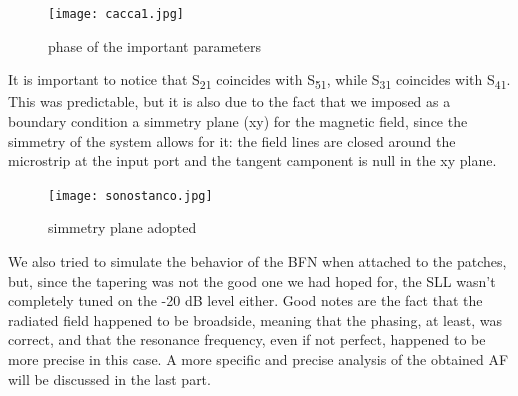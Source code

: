 \begin{figure}[H]
\centering
\texttt{[image: cacca1.jpg]}
\caption{phase of the important parameters}
\label{b}
\end{figure}


\par\medskip
\noindent
It is important to notice that S\textsubscript{21} coincides with S\textsubscript{51}, while S\textsubscript{31} coincides with S\textsubscript{41}. This was predictable, but it is also due to the fact that we imposed as a boundary condition a simmetry plane (xy) for the magnetic field, since the simmetry of the system allows for it: the field lines are closed around the microstrip at the input port and the tangent camponent is null in the xy plane.

\begin{figure}[H]
\centering
\texttt{[image: sonostanco.jpg]}
\caption{simmetry plane adopted}
\label{c}
\end{figure}

\par\medskip
\noindent
We also tried to simulate the behavior of the BFN when attached to the patches, but, since the tapering was not the good one we had hoped for, the SLL wasn't completely tuned on the -20 dB level either. Good notes are the fact that the radiated field happened to be broadside, meaning that the phasing, at least, was correct, and that the resonance frequency, even if not perfect, happened to be more precise in this case. A more specific and precise analysis of the obtained AF will be discussed in the last part.
